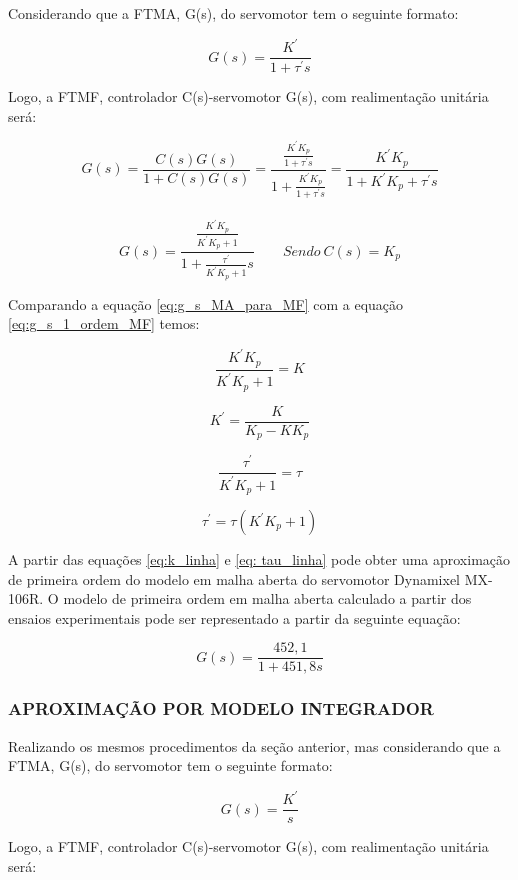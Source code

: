 \documentclass[12pt,oneside,a4paper, chapter=TITLE, section = TITLE, english, brazil]{abntex2}
\begin{document}
Considerando que a FTMA, G(s), do servomotor tem o seguinte formato:

$$G(s) = \frac{K^{'}}{1 + \tau^{'} s}$$

Logo, a FTMF, controlador C(s)-servomotor G(s), com realimentação unitária será:

$$G(s) = \frac{C(s)G(s)}{1 + C(s)G(s)} = \frac{\frac{K^{'} K_{p}}{1 + \tau^{'} s}}{1 + \frac{K^{'} K_{p}}{1 + \tau^{'} s}} = \frac{K^{'} K_{p}}{1 + K^{'} K_{p} + \tau^{'} s}$$
\\
\begin{equation}
G(s) = \frac{\frac{K^{'} K_{p}}{K^{'} K_{p} + 1}}{1 + \frac{\tau^{'}}{K^{'} K_{p} + 1} s} \label{eq:g_s_MA_para_MF} \qquad Sendo \ C(s) = K_{p}
\end{equation}

Comparando a equação \ref{eq:g_s_MA_para_MF} com a equação \ref{eq:g_s_1_ordem_MF} temos:

$$\frac{K^{'} K_{p}}{K^{'} K_{p} + 1} = K$$

\begin{equation}
K^{'} = \frac{K}{K_{p} - K K_{p}} \label{eq:k_linha}
\end{equation}

$$ \frac{\tau^{'}}{K^{'} K_{p} + 1} = \tau$$

\begin{equation}
\tau^{'} = \tau (K^{'} K_{p} + 1) \label{eq: tau_linha}
\end{equation}

A partir das equações \ref{eq:k_linha} e \ref{eq: tau_linha} pode obter uma aproximação de primeira ordem do modelo em malha aberta do servomotor Dynamixel MX-106R. O modelo de primeira ordem em malha aberta calculado a partir dos ensaios experimentais pode ser representado a partir da seguinte equação:

$$G(s) = \frac{452,1}{1 + 451,8 s}$$

\subsubsection{APROXIMAÇÃO POR MODELO INTEGRADOR} \label{sec:aprox_mod_int}

Realizando os mesmos procedimentos da seção anterior, mas considerando que a FTMA, G(s), do servomotor tem o seguinte formato:

$$G(s) = \frac{K^{'}}{s}$$

Logo, a FTMF, controlador C(s)-servomotor G(s), com realimentação unitária será:
\end{document}

